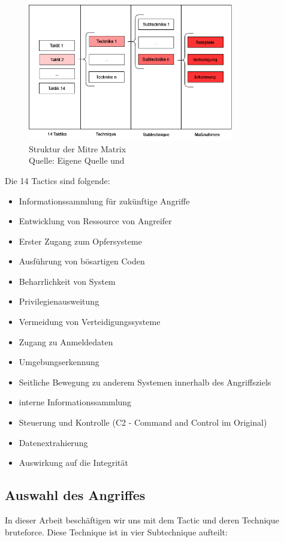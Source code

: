 \begin{figure}[H]
   \centering
   \includegraphics[width=0.8\textwidth]{assets/Mitre_structure.drawio.png}
   \caption{Struktur der Mitre Matrix \\Quelle: Eigene Quelle und \citep{Mitre_Started}}
   \centering
\end{figure}

{
Die 14 Tactics sind folgende:
\begin{itemize}[noitemsep]
   \item Informationssammlung für zukünftige Angriffe 
   \item	Entwicklung von Ressource von Angreifer
   \item Erster Zugang zum Opfersysteme 
   \item Ausführung von bösartigen Coden
   \item Beharrlichkeit von System
   \item	Privilegienausweitung
   \item Vermeidung von Verteidigungssysteme
   \item Zugang zu Anmeldedaten
   \item Umgebungserkennung
   \item Seitliche Bewegung zu anderem Systemen innerhalb des Angriffsziels
   \item interne Informationssammlung
   \item Steuerung und Kontrolle (C2 - Command and Control im Original)
   \item Datenextrahierung 
   \item	Auswirkung auf die Integrität
\end{itemize}
}

\subsection{Auswahl des Angriffes}
In dieser Arbeit beschäftigen wir uns mit dem Tactic  und deren Technique \gls{bruteforce}. Diese Technique ist in vier Subtechnique aufteilt:

